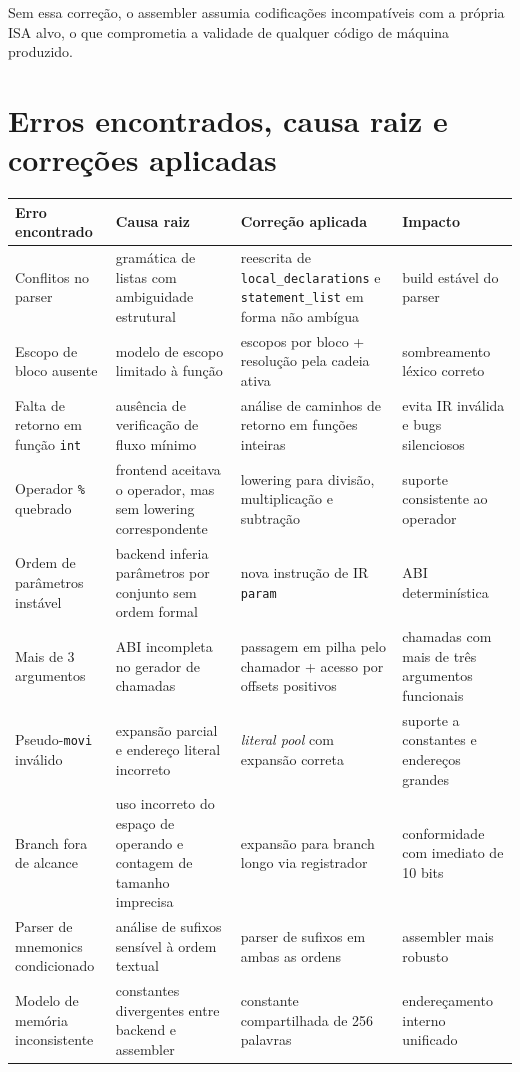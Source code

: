 \documentclass[12pt,a4paper]{article}
\begin{document}
Sem essa correção, o assembler assumia codificações incompatíveis com a própria ISA alvo, o que comprometia a validade de qualquer código de máquina produzido.

\section{Erros encontrados, causa raiz e correções aplicadas}
\begin{longtable}{>{\raggedright\arraybackslash}p{} >{\raggedright\arraybackslash}p{} >{\raggedright\arraybackslash}p{} >{\raggedright\arraybackslash}p{}}
\toprule
\textbf{Erro encontrado} & \textbf{Causa raiz} & \textbf{Correção aplicada} & \textbf{Impacto} \\
\midrule
\endhead
Conflitos no parser & gramática de listas com ambiguidade estrutural & reescrita de \texttt{local\_declarations} e \texttt{statement\_list} em forma não ambígua & build estável do parser \\
Escopo de bloco ausente & modelo de escopo limitado à função & escopos por bloco + resolução pela cadeia ativa & sombreamento léxico correto \\
Falta de retorno em função \texttt{int} & ausência de verificação de fluxo mínimo & análise de caminhos de retorno em funções inteiras & evita IR inválida e bugs silenciosos \\
Operador \texttt{\%} quebrado & frontend aceitava o operador, mas sem lowering correspondente & lowering para divisão, multiplicação e subtração & suporte consistente ao operador \\
Ordem de parâmetros instável & backend inferia parâmetros por conjunto sem ordem formal & nova instrução de IR \texttt{param} & ABI determinística \\
Mais de 3 argumentos & ABI incompleta no gerador de chamadas & passagem em pilha pelo chamador + acesso por offsets positivos & chamadas com mais de três argumentos funcionais \\
Pseudo-\texttt{movi} inválido & expansão parcial e endereço literal incorreto & \emph{literal pool} com expansão correta & suporte a constantes e endereços grandes \\
Branch fora de alcance & uso incorreto do espaço de operando e contagem de tamanho imprecisa & expansão para branch longo via registrador & conformidade com imediato de 10 bits \\
Parser de mnemonics condicionado & análise de sufixos sensível à ordem textual & parser de sufixos em ambas as ordens & assembler mais robusto \\
Modelo de memória inconsistente & constantes divergentes entre backend e assembler & constante compartilhada de 256 palavras & endereçamento interno unificado \\
\bottomrule
\end{longtable}
\end{document}

